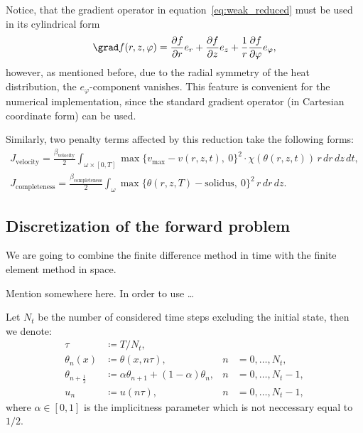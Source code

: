 Notice, that the gradient operator in equation~\eqref{eq:weak_reduced} must be used in its cylindrical form
\begin{equation*}
	\grad f(r,z,\varphi) =
		\frac{\partial f}{\partial r} e_r
		+
		\frac{\partial f}{\partial z} e_z
		+
		\frac{1}{r} \frac{\partial f}{\partial \varphi} e_{\varphi},
\end{equation*}
however, as mentioned before, due to the radial symmetry of the heat distribution, the $e_{\varphi}$-component vanishes. This feature is convenient for the numerical implementation, since the standard gradient operator (in Cartesian coordinate form) can be used.

Similarly, two penalty terms affected by this reduction take the following forms:
\begin{eqnarray}
	\label{eq:J_velocity_r}
	J_\text{velocity} =
	\frac{\beta_\text{velocity}}{2}
	\int_{\omega \times [0,T]} \max \{ v_{\max} - v(r,z,t),\ 0 \}^2 \cdot \chi(\theta(r,z,t))\, r\, dr\, dz\, dt, \\
	\label{eq:J_completeness_r}
	J_\text{completeness} =
	\frac{\beta_\text{completeness}}{2} \int_{\omega} \max\{ \theta(r,z,T) - \text{solidus},\ 0 \}^2\, r\, dr\, dz.
\end{eqnarray}


\subsection{Discretization of the forward problem}

We are going to combine the finite difference method in time with the finite element method in space.

{\color{TolHighContrastBlue}
Mention \fenics somewhere here.
In order to use \fenics \ldots
}

Let $N_t$ be the number of considered time steps excluding the initial state, then we denote:
\begin{align}
	\tau & \coloneqq T/N_t, \\
	\theta_n(x) & \coloneqq \theta(x,n\tau), & n &= 0, \ldots, N_t, \\
	\theta_{n+\frac{1}{2}} & \coloneqq \alpha\theta_{n+1} + (1-\alpha)\theta_n,
	 & n &= 0, \ldots, N_t-1, \\
	u_n & \coloneqq u(n\tau), & n &= 0, \ldots, N_t-1,
\end{align}
where $\alpha \in [0,1]$ is the implicitness parameter which is not neccessary equal to $1/2$.


